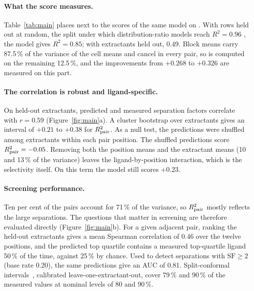 \paragraph{What the score measures.}
Table~\ref{tab:main} places \adjR{} next to the scores of the same model on \logD{}. With rows held out at random, the split under which distribution-ratio models reach $R^2 = 0.96$ \citep{liu2026}, the model gives $R^2 = 0.85$; with extractants held out, 0.49. Block means carry 87.5\,\% of the variance of the cell means and cancel in every pair, so \adjR{} is computed on the remaining 12.5\,\%, and the improvements from $+0.268$ to $+0.326$ are measured on this part.

\paragraph{The correlation is robust and ligand-specific.}
On held-out extractants, predicted and measured separation factors correlate with $r = 0.59$ (Figure~\ref{fig:main}a). A cluster bootstrap over extractants gives an interval of $+0.21$ to $+0.38$ for $R^2_{\mathrm{pair}}$. As a null test, the predictions were shuffled among extractants within each pair position. The shuffled predictions score $R^2_{\mathrm{pair}} = -0.05$. Removing both the position means and the extractant means (10 and 13\,\% of the variance) leaves the ligand-by-position interaction, which is the selectivity itself. On this term the model still scores $+0.23$.

\paragraph{Screening performance.}
Ten per cent of the pairs account for 71\,\% of the variance, so $R^2_{\mathrm{pair}}$ mostly reflects the large separations. The questions that matter in screening are therefore evaluated directly (Figure~\ref{fig:main}b). For a given adjacent pair, ranking the held-out extractants gives a mean Spearman correlation of 0.46 over the twelve positions, and the predicted top quartile contains a measured top-quartile ligand 50\,\% of the time, against 25\,\% by chance. Used to detect separations with $\mathrm{SF} \geq 2$ (base rate 0.20), the same predictions give an AUC of 0.81. Split-conformal intervals~\citep{vovk2005}, calibrated leave-one-extractant-out, cover 79\,\% and 90\,\% of the measured values at nominal levels of 80 and 90\,\%.

